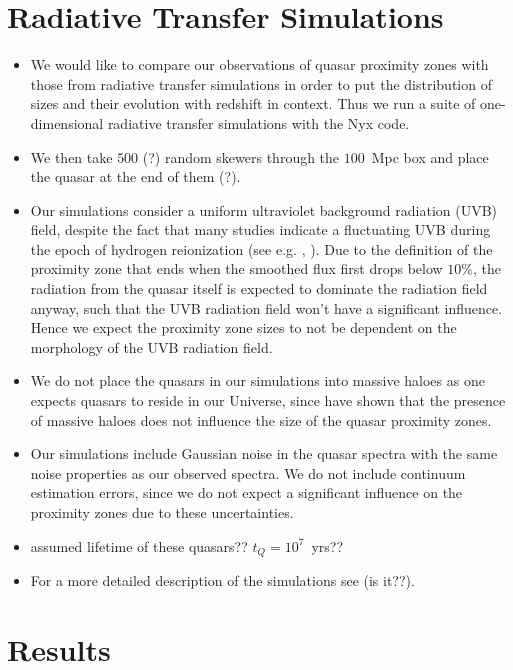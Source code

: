 \documentclass[iop]{emulateapj}
\begin{document}
\section{Radiative Transfer Simulations}\label{sec:sims}

\begin{itemize}
\item We would like to compare our observations of quasar proximity zones with those from radiative transfer simulations in order to put the distribution of sizes and their evolution with redshift in context. Thus we run a suite of one-dimensional radiative transfer simulations with the Nyx code\citep{Almgren2013}. 
\item We then take $500$ (?) random skewers through the $100$~Mpc box and place the quasar at the end of them (?). 
\item Our simulations consider a uniform ultraviolet background radiation (UVB) field, despite the fact that many studies indicate a fluctuating UVB during the epoch of hydrogen reionization (see e.g. \citet{Chardin2015}, \citet{DaviesFurlanetto2016}). Due to the definition of the proximity zone that ends when the smoothed flux first drops below $10\%$, the radiation from the quasar itself is expected to dominate the radiation field anyway, such that the UVB radiation field won't have a significant influence. Hence we expect the proximity zone sizes to not be dependent on the morphology of the UVB radiation field. 
\item We do not place the quasars in our simulations into massive haloes as one expects quasars to reside in our Universe, since \citet{Keating2015} have shown that the presence of massive haloes does not influence the size of the quasar proximity zones. 
\item Our simulations include Gaussian noise in the quasar spectra with the same noise properties as our observed spectra. We do not include continuum estimation errors, since we do not expect a significant influence on the proximity zones due to these uncertainties. 
\item assumed lifetime of these quasars?? $t_Q=10^7$~yrs??
\item For a more detailed description of the simulations see \citet{Davies2016} (is it??). 
\end{itemize}
 

\section{Results}\label{sec:results}
\end{document}

